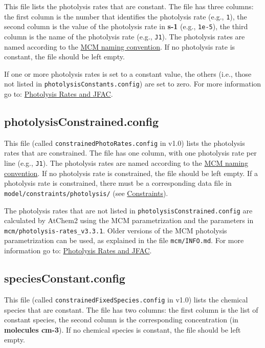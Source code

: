 This file lists the photolysis rates that are constant. The file has
three columns: the first column is the number that identifies the
photolysis rate (e.g., \texttt{1}), the second column is the value of
the photolysis rate in \textbf{s-1} (e.g., \texttt{1e-5}), the third
column is the name of the photolysis rate (e.g., \texttt{J1}). The
photolysis rates are named according to the
\href{http://mcm.leeds.ac.uk/MCM/parameters/photolysis.htt}{MCM
  naming convention}. If no photolysis rate is constant, the file
should be left empty.

If one or more photolysis rates is set to a constant value, the others
(i.e., those not listed in \texttt{photolysisConstants.config}) are
set to zero. For more information go to:
\hyperref[sec:photolysis-rates]{Photolysis Rates and JFAC}.

\subsection{photolysisConstrained.config} \label{subsec:photolysisconstrained}

This file (called \texttt{constrainedPhotoRates.config} in v1.0) lists
the photolysis rates that are constrained. The file has one column,
with one photolysis rate per line (e.g., \texttt{J1}). The photolysis
rates are named according to the
\href{http://mcm.leeds.ac.uk/MCM/parameters/photolysis.htt}{MCM
  naming convention}. If no photolysis rate is constrained, the file
should be left empty. If a photolysis rate is constrained, there must
be a corresponding data file in \texttt{model/constraints/photolysis/}
(see \hyperref[sec:constraints]{Constraints}).

The photolysis rates that are not listed in
\texttt{photolysisConstrained.config} are calculated by AtChem2 using
the MCM parametrization and the parameters in
\texttt{mcm/photolysis-rates\_v3.3.1}. Older versions of the MCM
photolysis parametrization can be used, as explained in the file
\texttt{mcm/INFO.md}. For more information go to:
\hyperref[sec:photolysis-rates]{Photolysis Rates and JFAC}.

\subsection{speciesConstant.config} \label{subsec:speciesconstant}

This file (called \texttt{constrainedFixedSpecies.config} in v1.0)
lists the chemical species that are constant. The file has two
columns: the first column is the list of constant species, the second
column is the corresponding concentration (in \textbf{molecules
  cm-3}). If no chemical species is constant, the file should be left
empty.

